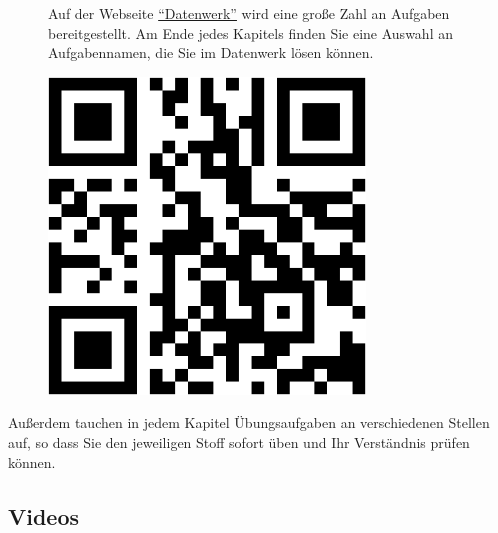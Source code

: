 \documentclass[
  a4paper,
]{scrbook}
\theoremstyle{definition}
\theoremstyle{definition}
\theoremstyle{definition}
\theoremstyle{remark}
\begin{document}
\begin{figure}

\begin{minipage}{0.80\linewidth}
Auf der Webseite \href{https://datenwerk.netlify.app/}{``Datenwerk''}
wird eine große Zahl an Aufgaben bereitgestellt. Am Ende jedes Kapitels
finden Sie eine Auswahl an Aufgabennamen, die Sie im Datenwerk lösen
können.\end{minipage}%
%
\begin{minipage}{0.20\linewidth}

\begin{center}
\includegraphics[width=0.75\textwidth,height=\textheight]{index_files/figure-pdf/unnamed-chunk-3-1.pdf}
\end{center}

\end{minipage}%

\end{figure}%

Außerdem tauchen in jedem Kapitel Übungsaufgaben an verschiedenen
Stellen auf, so dass Sie den jeweiligen Stoff sofort üben und Ihr
Verständnis prüfen können.

\subsection{Videos}\label{videos}
\end{document}
